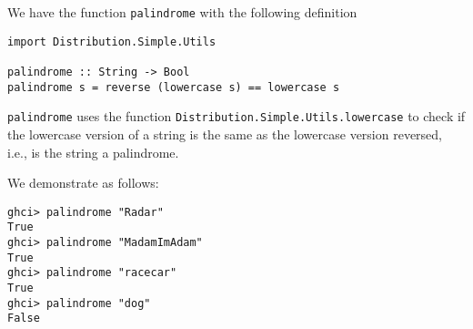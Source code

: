 
We have the function \verb|palindrome| with the following 
definition 
\begin{verbatim}
import Distribution.Simple.Utils

palindrome :: String -> Bool
palindrome s = reverse (lowercase s) == lowercase s 
\end{verbatim}
\verb|palindrome| uses the function 
\verb|Distribution.Simple.Utils.lowercase| to check if the lowercase version 
of a string is the same as the lowercase version reversed, i.e., is the 
string a palindrome.\par
\qquad We demonstrate as follows:
\begin{verbatim}
ghci> palindrome "Radar"
True
ghci> palindrome "MadamImAdam"
True
ghci> palindrome "racecar"
True
ghci> palindrome "dog"
False
\end{verbatim}
